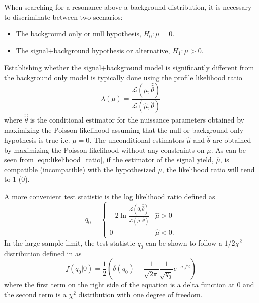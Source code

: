 When searching for a resonance above a background distribution, it is 
necessary to discriminate between two scenarios:
\begin{itemize}
    \item The background only or null hypothesis, $H_{0}: \mu = 0$.
    \item The signal+background hypothesis or alternative, $H_{1}: \mu > 0$.
\end{itemize}
Establishing whether the signal+background model is significantly different 
from the background only model is typically done using the profile likelihood
ratio
\begin{equation}
    \lambda(\mu) = \frac{\mathcal{L}(\mu, \hat{\hat{\theta}})}{\mathcal{L}(\hat{\mu}, \hat{\theta})}
    \label{eqn:likelihood_ratio}
\end{equation}
where $\hat{\hat{\theta}}$ is the conditional estimator for the nuissance parameters 
obtained by maximizing the Poisson likelihood assuming that the null or 
background only hypothesis is true i.e. $\mu = 0$. The unconditional estimators $\hat{\mu}$ 
and $\hat{\theta}$ are obtained by maximizing the Poisson likelihood without
any constraints on $\mu$.
As can be seen from \ref{eqn:likelihood_ratio}, 
if the estimator of the signal yield, $\hat{\mu}$, is compatible (incompatible)
with the hypothesized $\mu$, the likelihood ratio will tend to 1 (0).

A more convenient test statistic is the log likelihood ratio defined as
\begin{equation}
    q_0 = \begin{cases}
            -2 \ln \frac{\mathcal{L}(0, \hat{\hat{\theta}})}{\mathcal{L}(\hat{\mu}, \hat{\theta})} 
            & \hat{\mu} > 0 \\
             0  & \hat{\mu} < 0.
        \end{cases}
\end{equation}
In the large sample limit, the test statistic
$q_0$ can be shown to follow a $1/2\chi^2$ distribution defined in \cite{Cowan:2010js} as 
\begin{equation}
    f(q_{0}|0) = \frac{1}{2} \left(\delta(q_{0}) + \frac{1}{\sqrt{2\pi}}\frac{1}{\sqrt{q_{0}}}e^{-q_0/2} \right)
    \label{eqn:half_chi}
\end{equation}
where the first term on the right side of the equation is a delta function at 0
and the second term is a $\chi^2$ distribution with one degree of freedom. 

